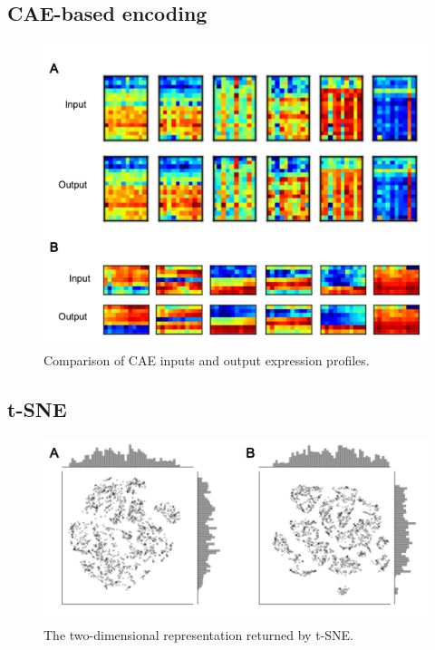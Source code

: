 \documentclass[12pt,oneside,onecolumn,a4paper]{article}
\begin{document}
\subsection{CAE-based encoding}


\begin{figure}[H]
\begin{center}
\includegraphics[width=\columnwidth]{figures/input_output}
\caption{Comparison of CAE inputs and output expression profiles. \label{fig:input_output}%
}
\end{center}
\end{figure}

\subsection{t-SNE}

\begin{figure}[H]
\begin{center}
\includegraphics[width=\columnwidth]{figures/raw_coords}
\caption{The two-dimensional representation returned by t-SNE. \label{fig:tsne_scatter}%
}
\end{center}
\end{figure}
\end{document}
